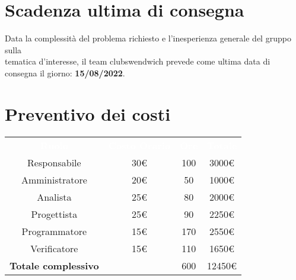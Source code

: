 \section{Scadenza ultima di consegna}
Data la complessità del problema richiesto e l'inesperienza generale del gruppo sulla \\
tematica d'interesse, il team clubswendwich prevede come ultima data di consegna 
il giorno: \textbf{15/08/2022}.

\section{Preventivo dei costi}
{\renewcommand{\arraystretch}{1.5}
\begin{tabular}{cccc}
	\rowcolor[RGB]{33, 73, 50}
	\textcolor{white}{\textbf{Ruolo}} & \textcolor{white}{\textbf{Costo Orario}} 
    & \textcolor{white}{\textbf{Ore}} & \textcolor{white}{\textbf{Totale}}\\
	\rowcolor[RGB]{216, 235, 171}
	Responsabile & 30€ & 100 & 3000€     			\\
	\rowcolor[RGB]{233, 245, 206}
	Amministratore & 20€ & 50 & 1000€    			\\
    \rowcolor[RGB]{216, 235, 171}
	Analista & 25€ & 80 & 2000€          			\\
	\rowcolor[RGB]{233, 245, 206}
	Progettista & 25€ & 90 & 2250€       			\\
    \rowcolor[RGB]{216, 235, 171}
	Programmatore & 15€ & 170 & 2550€     			\\
	\rowcolor[RGB]{233, 245, 206}
	Verificatore & 15€ & 110 & 1650€      			\\
	\rowcolor[RGB]{216, 235, 171}
	\textbf{Totale complessivo} & & 600 & 12450€    \\
\end{tabular}	
}


